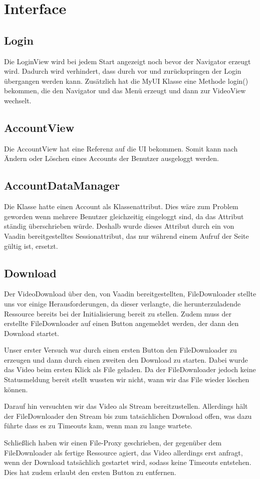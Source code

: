 \section{Interface}

\subsection{Login}
Die LoginView wird bei jedem Start angezeigt noch bevor der Navigator erzeugt wird. Dadurch wird verhindert, dass durch vor und zurückspringen der Login übergangen werden kann. Zusätzlich hat die MyUI Klasse eine Methode login() bekommen, die den Navigator und das Menü erzeugt und dann zur VideoView wechselt.

\subsection{AccountView}
Die AccountView hat eine Referenz auf die UI bekommen. Somit kann nach Ändern oder Löschen eines Accounts der Benutzer ausgeloggt werden.

\subsection{AccountDataManager}
Die Klasse hatte einen Account als Klassenattribut. Dies wäre zum Problem geworden wenn mehrere Benutzer gleichzeitig eingeloggt sind, da das Attribut ständig überschrieben würde. Deshalb wurde dieses Attribut durch ein von Vaadin bereitgestelltes Sessionattribut, das nur während einem Aufruf der Seite gültig ist, ersetzt.

\subsection{Download} \label{sec:Download}
Der VideoDownload über den, von Vaadin bereitgestellten, FileDownloader stellte uns vor einige Herausforderungen, da dieser verlangte, die herunterzuladende Ressource bereits bei der Initialisierung bereit zu stellen. Zudem muss der erstellte FileDownloader auf einen Button angemeldet werden, der dann den Download startet. \par
Unser erster Versuch war durch einen ersten Button den FileDownloader zu erzeugen und dann durch einen zweiten den Download zu starten. Dabei wurde das Video beim ersten Klick als File geladen. Da der FileDownloader jedoch keine Statusmeldung bereit stellt wussten wir nicht, wann wir das File wieder löschen können. \par
Darauf hin versuchten wir das Video als Stream bereitzustellen. Allerdings hält der FileDownloader den Stream bis zum tatsächlichen Download offen, was dazu führte dass es zu Timeouts kam, wenn man zu lange wartete. \par
Schließlich haben wir einen File-Proxy geschrieben, der gegenüber dem FileDownloader als fertige Ressource agiert, das Video allerdings erst anfragt, wenn der Download tatsächlich gestartet wird, sodass keine Timeouts entstehen. Dies hat zudem erlaubt den ersten Button zu entfernen.

